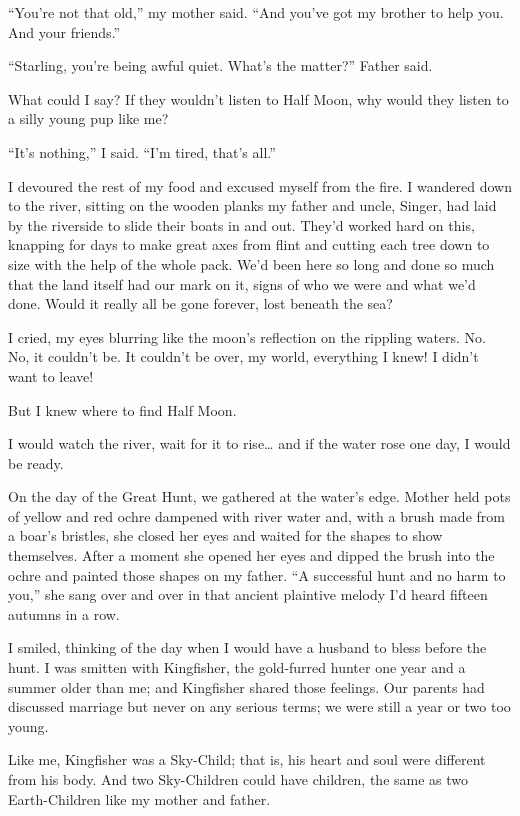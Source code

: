 ``You're not that old,'' my mother said. ``And you've got my brother to help you. And your friends.''

``Starling, you're being awful quiet. What's the matter?'' Father said.

What could I say? If they wouldn't listen to Half Moon, why would they listen to a silly young pup like me?

``It's nothing,'' I said. ``I'm tired, that's all.''

I devoured the rest of my food and excused myself from the fire. I wandered down to the river, sitting on the wooden planks my father and uncle, Singer, had laid by the riverside to slide their boats in and out. They'd worked hard on this, knapping for days to make great axes from flint and cutting each tree down to size with the help of the whole pack. We'd been here so long and done so much that the land itself had our mark on it, signs of who we were and what we'd done. Would it really all be gone forever, lost beneath the sea?

I cried, my eyes blurring like the moon's reflection on the rippling waters. No. No, it couldn't be. It couldn't be over, my world, everything I knew! I didn't want to leave!

But I knew where to find Half Moon.

I would watch the river, wait for it to rise\ldots{} and if the water rose one day, I would be ready.

\secdiv

\noindent On the day of the Great Hunt, we gathered at the water's edge. Mother held pots of yellow and red ochre dampened with river water and, with a brush made from a boar's bristles, she closed her eyes and waited for the shapes to show themselves. After a moment she opened her eyes and dipped the brush into the ochre and painted those shapes on my father. ``A successful hunt and no harm to you,'' she sang over and over in that ancient plaintive melody I'd heard fifteen autumns in a row.

I smiled, thinking of the day when I would have a husband to bless before the hunt. I was smitten with Kingfisher, the gold-furred hunter one year and a summer older than me; and Kingfisher shared those feelings. Our parents had discussed marriage but never on any serious terms; we were still a year or two too young.

Like me, Kingfisher was a Sky-Child; that is, his heart and soul were different from his body. And two Sky-Children could have children, the same as two Earth-Children like my mother and father.

